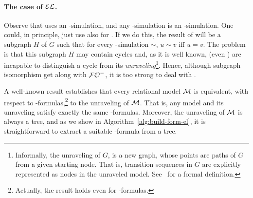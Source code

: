 \paragraph{The case of $\mathcal{EL}$.}
Observe that  uses an \EL-simulation, and any
\EPFOL-simulation is an \EL-simulation.
%
One could, in principle, just use  also for
\EL. If we do this, the result of  will be a
subgraph $H$ of $G$ such that for every \EL-simulation $\sim$, $u
\sim v$ iff $u = v$. The problem is that this subgraph $H$ may
contain cycles and, as it is well known, \EL (even \ALC) are
incapable to distinguish a cycle from its {\em
unraveling}\footnote{Informally, the unraveling of $G$, is a new
graph, whose points are paths of $G$ from a given starting node.
That is, transition sequences in $G$ are explicitly represented as
nodes in the unraveled model. See~\cite{BRV01} for a formal
definition.}. Hence, although subgraph isomorphism get along with
${\mathcal{FO}^-}$, it is too strong to deal with \EL.
%
%

A well-known result establishes that every relational model $\mathcal{M}$ is
equivalent, with respect to \EL-formulas,\footnote{Actually, the
result holds even for \ALC-formulas.} to the unraveling of $\mathcal{M}$.
That is, any model and its unraveling satisfy exactly the same \EL-formulas.
 Moreover, the unraveling of $\mathcal{M}$ is
always a tree, and as we show in Algorithm~\ref{alg:build-form-el},
it is straightforward to extract a suitable \EL-formula from a tree.

